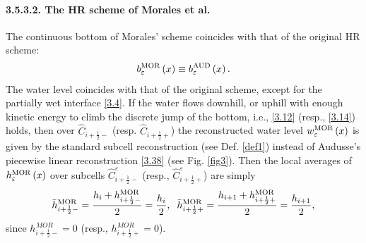 \documentclass[11pt,a4paper,center,notitlepage]{article}
\numberwithin{equation}{section}
\begin{document}
\paragraph{3.5.3.2. The HR scheme of Morales et al.} The continuous bottom of Morales' scheme coincides with that of the original HR scheme: 
\begin{align}
b_\varepsilon ^{\rm MOR}\left( x \right) \equiv b_\varepsilon ^{\rm AUD}\left( x \right).
\end{align}
The water level coincides with that of the original scheme, except for the partially wet interface \eqref{3.4}. If the water flows downhill, or uphill with enough kinetic energy to climb the discrete jump of the bottom, i.e., \eqref{3.12} (resp., \eqref{3.14}) holds, then over ${\widehat C_{i + \frac{1}{2} - }}$ (resp. ${\widehat C_{i + \frac{1}{2} + }}$) the reconstructed water level $w_\varepsilon ^{\rm MOR} \left(x\right)$ is given by the standard subcell reconstruction (see Def. \ref{def1}) instead of Audusse's piecewise linear reconstruction \eqref{3.38} (see Fig. \ref{fig3}). Then the local averages of $h_\varepsilon ^{\rm MOR}\left(x\right)$ over subcells $\widehat C_{i + \frac{1}{2} - }^\varepsilon$ (resp., $\widehat C_{i + \frac{1}{2} + }^\varepsilon $) are simply
\begin{align}
\label{3.46}
\bar h_{i + \frac{1}{2} - }^{\rm MOR} = \frac{{{h_i} + h_{i + \frac{1}{2} - }^{\rm MOR}}}{2} = \frac{{{h_i}}}{2}, \hspace{2mm} \bar h_{i + \frac{1}{2} + }^{\rm MOR} = \frac{{{h_{i + 1}} + h_{i + \frac{1}{2} + }^{\rm MOR}}}{2} = \frac{{{h_{i + 1}}}}{2},
\end{align}
since ${h_{i + \frac{1}{2} - }^{MOR}} =0$ (resp., ${h_{i + \frac{1}{2} +}^{MOR}} =0$).
\end{document}

